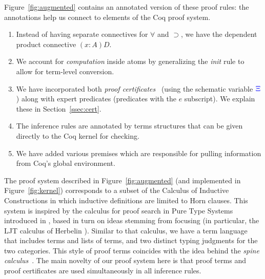 Figure~\ref{fig:augmented} contains an annotated version of these
proof rules: the annotations help us connect to elements of the Coq
proof system.
\begin{enumerate}
  \item Instead of having separate connectives for $\forall$ and
    $\supset$, we have the dependent product connective $(x:A)D$. 
  \item We account for \emph{computation} inside atoms by generalizing
    the \emph{init} rule to allow for term-level conversion.
  \item We have incorporated both \emph{proof
  certificates}~\cite{chihani17jar} (using the schematic variable
    ${\color{blue}{\Xi}}$) along with expert predicates (predicates with the $e$
    subscript). We explain these in Section~\ref{ssec:cert}.
  \item The inference rules are  annotated by terms structures that
    can be given directly to the Coq kernel for checking.
  \item We have added various premises which are responsible for
    pulling information from Coq's global environment.
\end{enumerate}
The proof system described in Figure~\ref{fig:augmented} (and
implemented in Figure~\ref{fig:kernel}) corresponds to a subset of the Calculus
of Inductive Constructions in which inductive definitions are
limited to %
Horn clauses.
%
This  system is inspired by the calculus for proof search in
Pure Type Systems introduced in \cite{LengrandDM06}, based in turn on
ideas stemming from focusing (in particular, the LJT calculus of
Herbelin \cite{Herbelin94}). Similar to that calculus, we have a
term language that includes terms and lists of terms, and two distinct
typing judgments for the two categories.
%
This style of  proof terms coincides with the idea behind the \emph{spine
  calculus}~\cite{Cervesato97tr}.  The main novelty of our proof
system here is that proof terms and proof certificates are used
simultaneously in all inference rules.

